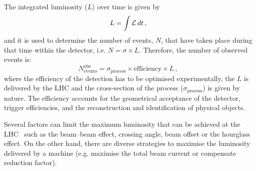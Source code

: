 The integrated luminosity ($L$) over time is given by 
\begin{equation*}
	 L = \int \mathcal{L} \, dt \, ,
\end{equation*}
 and it is used to determine the number of events, $N$, that have taken place during 
 that time within the detector, i.e. $N = \sigma \times L$. 
 Therefore, the number of observed events is:
 \begin{equation*}
	N^{\text{obs}}_{\text{events}} = \sigma_{\text{process}} \times \text{efficiency} \times L \, ,
 \end{equation*}
where the efficiency of the detection has to be optimised experimentally, the $L$ is delivered
by the LHC and the cross-section of the 
process ($\sigma_{\text{process}}$) is given by nature. The efficiency accounts for the 
geometrical acceptance of the detector, trigger efficiencies, and the reconstruction and
identification of physical objects. 

Several factors can limit the maximum luminosity that can be achieved at the LHC~\cite{Herr:941318} 
such as the beam--beam effect, crossing angle, beam offset or the hourglass effect. 
On the other hand, there are diverse strategies to maximise the luminosity delivered 
by a machine (e.g. maximise the total beam current or %
compensate reduction factor).

\begin{comment}
\begin{itemize}
	\item \textbf{Beam--beam effect}: The bunches of two beams or the particles in the same bunch can interact electromagnetically, this leads to distortions from the orbit and results in an increase of the emittance, $\epsilon$.
	\item \textbf{Crossing angle}: Often used to avoid unwanted collisions in machines with many bunches, due to the crossing angle $\theta_c$, 
				the luminosity is reduced by a factor $F(\theta_{c},\sigma_{x},\sigma_{z}) = \sqrt{1+(\theta_{c}\sigma_{z}/2\sigma{x})^2}$.
	\item \textbf{Beam offset}: Originated from the beam-beam effects or misalignments in the quadrupole magnets, the beams can collide with 
				small transverse offset. Such beams' offsets induce a loss of $\lumi$ at the IP.
	\item \textbf{Hourglass effect}: Appears when beams collide in a point away from the IP. 
\end{itemize}

\begin{itemize}
	\item \textbf{Maximise the total beam current}: Improvements in beam collimation, cryogenics vacuum and background protection could extend the limit on the maximum beam current. 
	\item \textbf{Compensate reduction factor}: The hourglass effect may be reduced by shorter bunches at the expense of a higher longitudinal pileup density (see Section~\ref{sec:Chap2:LHC:pileup}).
\end{itemize}
\end{comment}




